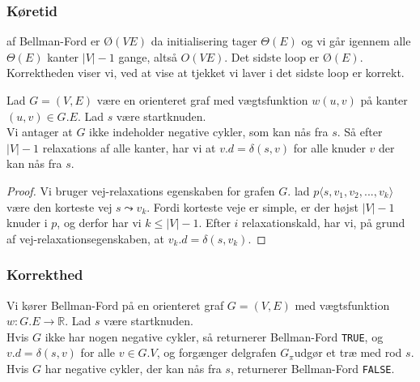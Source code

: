 \subsubsection{Køretid}
af Bellman-Ford er $Ø(VE)$ da initialisering tager $\Theta(E)$ og vi går igennem alle $\Theta(E)$ kanter $|V| - 1$ gange, altså $O(VE)$. Det sidste loop er $Ø(E)$.\\

Korrektheden viser vi, ved at vise at tjekket vi laver i det sidste loop er korrekt.
\begin{lemma}
  Lad $G = (V,E)$ være en orienteret graf med vægtsfunktion $w(u,v)$ på kanter $(u,v) \in G.E$. Lad $s$ være startknuden.\\
  Vi antager at $G$ ikke indeholder negative cykler, som kan nås fra $s$. Så efter $|V| - 1$ relaxations af alle kanter, har vi at $v.d = \delta(s,v)$ for alle knuder $v$ der kan nås fra $s$.
\end{lemma}

\begin{proof}
  Vi bruger vej-relaxations egenskaben for grafen $G$. lad $p \langle s, v_1, v_2 , ..., v_k\rangle$ være den korteste vej $s \leadsto v_k$. Fordi korteste veje er simple, er der højst $|V| - 1$ knuder i $p$, og derfor har vi $k \leq |V| - 1$. Efter $i$ relaxationskald, har vi, på grund af vej-relaxationsegenskaben, at $v_k.d = \delta(s,v_k)$.
\end{proof}

\subsubsection{Korrekthed}
\begin{theorem}
  
  Vi kører Bellman-Ford på en orienteret graf $G = (V, E)$ med vægtsfunktion $w : G.E \rightarrow \mathbb{R}$. Lad $s$ være startknuden.\\
  Hvis $G$ ikke har nogen negative cykler, så returnerer Bellman-Ford \texttt{TRUE}, og $v.d = \delta(s,v)$ for alle $v \in G.V$, og forgænger delgrafen $G_\pi$udgør et træ med rod $s$.\\
  Hvis $G$ har negative cykler, der kan nås fra $s$, returnerer Bellman-Ford \texttt{FALSE}.
\end{theorem}

